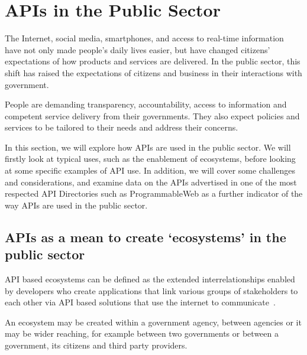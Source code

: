 
\chapter{APIs in the Public Sector}

\ifpdf
    \graphicspath{{Chapter2/Figs/Raster/}{Chapter2/Figs/PDF/}{Chapter2/Figs/}}
\else
    \graphicspath{{Chapter2/Figs/Vector/}{Chapter2/Figs/}}
\fi

The Internet, social media, smartphones, and access to real-time information
have not only made people’s daily lives easier, but have changed citizens’
expectations of how products and services are delivered. In the public sector,
this shift has raised the expectations of citizens and business in their
interactions with government.

People are demanding transparency, accountability, access to information and
competent service delivery from their governments. They also expect policies
and services to be tailored to their needs and address their concerns.

In this section, we will explore how APIs are used in the public sector.
We will firstly look at typical uses, such as the enablement of ecosystems,
before looking at some specific examples of API use. In addition, we will
cover some challenges and considerations, and examine data on the APIs
advertised in one of the most respected API Directories such as
ProgrammableWeb as a further indicator of the way APIs are used in the
public sector.


\section{APIs as a mean to create ‘ecosystems’ in the public sector}

API based ecosystems can be defined as the extended interrelationships enabled
by developers who create applications that link various groups of stakeholders
to each other via API based solutions that use the internet to communicate~\citep{api_ecosystems}.

An ecosystem may be created within a government agency, between agencies or
it may be wider reaching, for example between two governments or between a government,
its citizens and third party providers.


